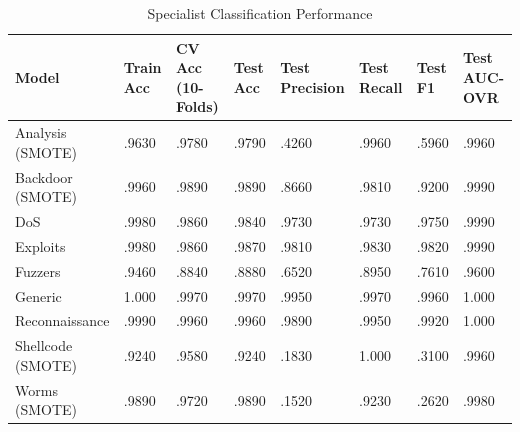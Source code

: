 \documentclass[pdflatex,sn-mathphys-num]{sn-jnl}
\theoremstyle{thmstyleone}%
\theoremstyle{thmstyletwo}%
\theoremstyle{thmstylethree}%
\begin{document}
\begin{table}[htbp]
\centering
\small
\caption{Specialist Classification Performance}
\label{SpecialistsClassifierPerformance}

\renewcommand{\arraystretch}{1.0}
\setlength{\tabcolsep}{4pt}
\begin{tabular}{@{}p{2.7cm}p{1.4cm}p{2.5cm}p{1.2cm}p{1.9cm}p{1.5cm}p{1cm}p{2.1cm}@{}}

\toprule
\textbf{Model} 
& \textbf{Train Acc}
& \textbf{CV Acc (10-Folds)} 
& \textbf{Test Acc} 
& \textbf{Test Precision} 
& \textbf{Test Recall} 
& \textbf{Test F1}
& \textbf{Test AUC-OVR} \\
\midrule

Analysis (SMOTE)  & .9630 & .9780 & .9790 & .4260 & .9960 & .5960 & .9960 \\
Backdoor (SMOTE)  & .9960 & .9890 & .9890 & .8660 & .9810 & .9200 & .9990 \\
DoS               & .9980 & .9860 & .9840 & .9730 & .9730 & .9750 & .9990 \\
Exploits          & .9980 & .9860 & .9870 & .9810 & .9830 & .9820 & .9990 \\
Fuzzers           & .9460 & .8840 & .8880 & .6520 & .8950 & .7610 & .9600 \\
Generic           & 1.000 & .9970 & .9970 & .9950 & .9970 & .9960 & 1.000 \\
Reconnaissance    & .9990 & .9960 & .9960 & .9890 & .9950 & .9920 & 1.000 \\
Shellcode (SMOTE) & .9240 & .9580 & .9240 & .1830 & 1.000 & .3100 & .9960 \\
Worms (SMOTE)     & .9890 & .9720 & .9890 & .1520 & .9230 & .2620 & .9980 \\


\bottomrule
\end{tabular}
\end{table}
\end{document}
